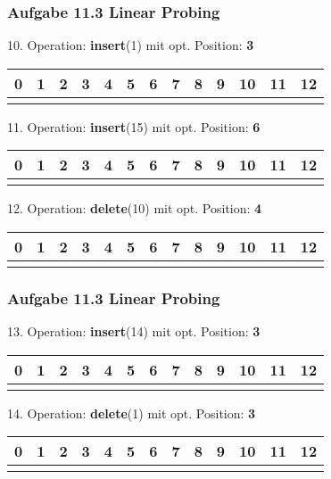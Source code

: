 \documentclass{beamer}
\begin{document}
\begin{frame}
	\frametitle{Aufgabe 11.3 Linear Probing}
	10. Operation: \textbf{insert}(1) mit opt. Position: \textbf{3}
	\begin{table}
		\centering
		\begin{tabular}{c|c|c|c|c|c|c|c|c|c|c|c|c}
			0 & 1 & 2 & 3 & 4 & 5 & 6 & 7 & 8 & 9 & 10 & 11 & 12 \\
			\hline
			  &   &   &   &   &   &   &   &   &   &    &    &    \\
		\end{tabular}
	\end{table}

	11. Operation: \textbf{insert}(15) mit opt. Position: \textbf{6}
	\begin{table}
		\centering
		\begin{tabular}{c|c|c|c|c|c|c|c|c|c|c|c|c}
			0 & 1 & 2 & 3 & 4 & 5 & 6 & 7 & 8 & 9 & 10 & 11 & 12 \\
			\hline
			  &   &   &   &   &   &   &   &   &   &    &    &    \\
		\end{tabular}
	\end{table}

	12. Operation: \textbf{delete}(10) mit opt. Position: \textbf{4}
	\begin{table}
		\centering
		\begin{tabular}{c|c|c|c|c|c|c|c|c|c|c|c|c}
			0 & 1 & 2 & 3 & 4 & 5 & 6 & 7 & 8 & 9 & 10 & 11 & 12 \\
			\hline
			  &   &   &   &   &   &   &   &   &   &    &    &    \\
		\end{tabular}
	\end{table}
\end{frame}

\begin{frame}
	\frametitle{Aufgabe 11.3 Linear Probing}
	13. Operation: \textbf{insert}(14) mit opt. Position: \textbf{3}
	\begin{table}
		\centering
		\begin{tabular}{c|c|c|c|c|c|c|c|c|c|c|c|c}
			0 & 1 & 2 & 3 & 4 & 5 & 6 & 7 & 8 & 9 & 10 & 11 & 12 \\
			\hline
			  &   &   &   &   &   &   &   &   &   &    &    &    \\
		\end{tabular}
	\end{table}

	14. Operation: \textbf{delete}(1) mit opt. Position: \textbf{3}
	\begin{table}
		\centering
		\begin{tabular}{c|c|c|c|c|c|c|c|c|c|c|c|c}
			0 & 1 & 2 & 3 & 4 & 5 & 6 & 7 & 8 & 9 & 10 & 11 & 12 \\
			\hline
			  &   &   &   &   &   &   &   &   &   &    &    &    \\
		\end{tabular}
	\end{table}
\end{frame}
\end{document}
